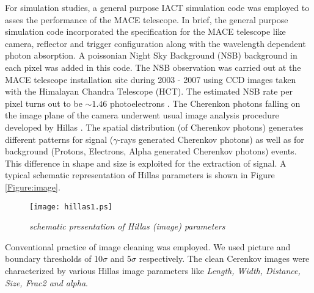 \documentclass[preprint,12pt]{elsarticle}
\begin{document}
For simulation studies, a general 
purpose IACT simulation code was employed \cite{chinmayB} to asses the performance of the MACE telescope. In brief, the general purpose simulation code incorporated 
the specification for the MACE telescope like camera, reflector and trigger configuration along with the wavelength dependent photon absorption. A poissonian 
Night Sky Background (NSB) background in each pixel was added in this code. The NSB observation was carried out at the MACE telescope installation site \cite{stalin}
during 2003 - 2007 using CCD images taken with the Himalayan Chandra Telescope (HCT). The estimated NSB rate per pixel turns out to be $\sim 1.46$ photoelectrons \cite{chinmayB}.
The Cherenkon photons falling on the image plane of the camera underwent usual image analysis procedure developed by Hillas \cite{Hillas}. 
The spatial distribution (of Cherenkov photons)  generates different patterns for signal ($\gamma$-rays generated Cherenkov photons) as well as for background (Protons, 
Electrons, Alpha generated Cherenkov photons) events. This difference in shape and size is exploited for the extraction of signal. 
A typical schematic representation of Hillas parameters is shown in 
Figure \ref{Figure:image}.
\begin{figure}[!h]
\begin{center}
\texttt{[image: hillas1.ps]}
\caption{{\it schematic presentation of Hillas (image) parameters}}\label{Figure:image}
\label{fig_had}
\end{center}
\end{figure}
Conventional practice of image cleaning \cite{cleaning} was employed. We used picture and boundary thresholds of 10$\sigma$ and 5$\sigma$ respectively. 
The clean Cerenkov images were characterized by various Hillas image parameters \cite{Hillas} like {\it Length, Width, Distance, Size, Frac2 and alpha}.
\end{document}
